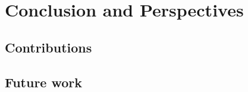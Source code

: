 
\chapter{Conclusion and Perspectives} %

\label{Chapter6} %

\section{Contributions}

\section{Future work}






%


